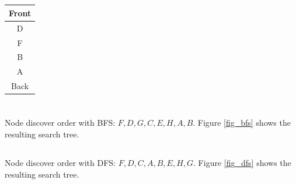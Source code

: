 \documentclass[12pt]{article}
\begin{document}
\subsection{}

\begin{tabular}{ c }
  Front \\
  \hline
  D \\
  F \\
  B \\
  A \\
  \hline
  Back
\end{tabular}

\section{} %
\subsection{}

Node discover order with BFS: ${F,D,G,C,E,H,A,B}$. Figure \ref{fig_bfs} shows the resulting search tree.

\subsection{}

Node discover order with DFS: ${F,D,C,A,B,E,H,G}$. Figure \ref{fig_dfs} shows the resulting search tree.
\end{document}
